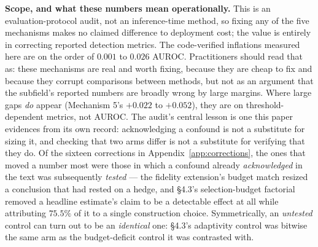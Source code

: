 \documentclass[10pt]{article} %
\begin{document}
\textbf{Scope, and what these numbers mean operationally.} This is an
evaluation-protocol audit, not an inference-time method, so fixing any of the
five mechanisms makes no claimed difference to deployment cost; the value is
entirely in correcting reported detection metrics. The code-verified inflations
measured here are on the order of $0.001$ to $0.026$ AUROC. Practitioners
should read that as: these mechanisms are real and worth fixing, because they
are cheap to fix and because they corrupt comparisons between methods, but not
as an argument that the subfield's reported numbers are broadly wrong by large
margins. Where large gaps \emph{do} appear (Mechanism 5's $+0.022$ to
$+0.052$), they are on threshold-dependent metrics, not AUROC. The audit's
central lesson is one this paper evidences from its own record: acknowledging a
confound is not a substitute for sizing it, and checking that two arms differ
is not a substitute for verifying that they do. Of the sixteen corrections in
Appendix~\ref{app:corrections}, the ones that moved a number most were those in
which a confound already \emph{acknowledged} in the text was subsequently
\emph{tested} --- the fidelity extension's budget match resized a conclusion
that had rested on a hedge, and §4.3's selection-budget factorial removed a
headline estimate's claim to be a detectable effect at all while attributing
$75.5\%$ of it to a single construction choice. Symmetrically, an
\emph{untested} control can turn out to be an \emph{identical} one: §4.3's
adaptivity control was bitwise the same arm as the budget-deficit control it
was contrasted with.
\end{document}
